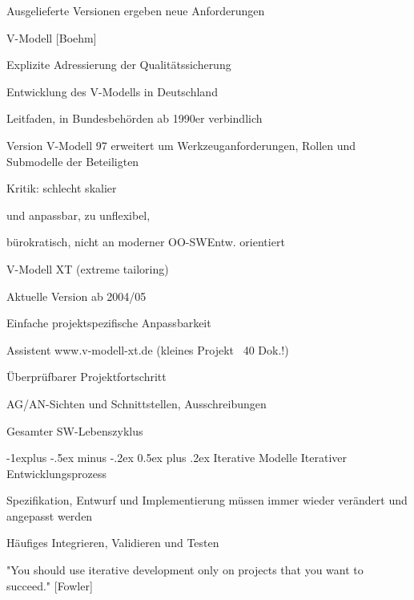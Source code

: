 \documentclass[a4paper]{article}
\makeatletter
\renewcommand{\subsection}{\@startsection{subsection}{2}{0mm}%
                                {-1explus -.5ex minus -.2ex}%
                                {0.5ex plus .2ex}%
                                {\normalfont\normalsize\bfseries}}
\makeatother
\begin{document}
\begin{multicols}{3}
\begin{itemize*}
\begin{itemize*}
\begin{itemize*}
        \item Ausgelieferte Versionen ergeben neue Anforderungen
      \end{itemize*}
      \item V-Modell [Boehm]
      \begin{itemize*}
        \item Explizite Adressierung der Qualitätssicherung
        \item Entwicklung des V-Modells in Deutschland
        \begin{itemize*}
          \item Leitfaden, in Bundesbehörden ab 1990er verbindlich
          \item Version V-Modell 97 erweitert um Werkzeuganforderungen, Rollen und Submodelle der Beteiligten
          \item Kritik: schlecht skalier\item und anpassbar, zu unflexibel,
          \item bürokratisch, nicht an moderner OO-SWEntw. orientiert
        \end{itemize*}
        \item V-Modell XT (extreme tailoring)
        \begin{itemize*}
          \item Aktuelle Version ab 2004/05
          \item Einfache projektspezifische Anpassbarkeit
          \item Assistent www.v-modell-xt.de (kleines Projekt ~40 Dok.!)
          \item Überprüfbarer Projektfortschritt
          \item AG/AN-Sichten und Schnittstellen, Ausschreibungen
          \item Gesamter SW-Lebenszyklus
        \end{itemize*}
      \end{itemize*}
    \end{itemize*}
  \end{itemize*}


  \subsection{Iterative Modelle}
  Iterativer Entwicklungsprozess
  \begin{itemize*}
    \item Spezifikation, Entwurf und Implementierung müssen immer wieder verändert und angepasst werden
    \item Häufiges Integrieren, Validieren und Testen
    \item "You should use iterative development only on projects that you want to succeed." [Fowler]
  \end{itemize*}


\end{multicols}
\end{document}
